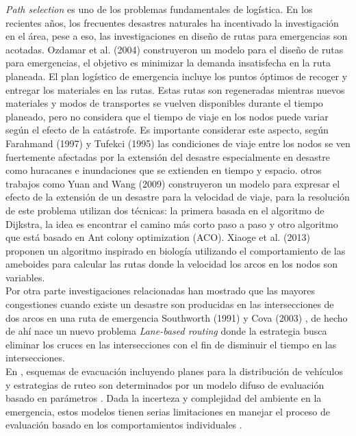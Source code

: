 \documentclass[letter, 10pt]{article}
\begin{document}
\textit{Path selection} es uno de los problemas fundamentales de logística. En los recientes años, los frecuentes desastres naturales ha incentivado la investigación en el área, pese a eso, las investigaciones en diseño de rutas para emergencias son acotadas. 
Ozdamar et al. (2004) \cite{ozdamar2004emergency} construyeron un modelo para el diseño de rutas para emergencias, el objetivo es minimizar la demanda insatisfecha en la ruta planeada. El plan logístico de emergencia incluye los puntos óptimos de recoger y entregar los materiales en las rutas. Estas rutas son regeneradas mientras nuevos materiales y modos de transportes se vuelven disponibles durante el tiempo planeado, pero no considera que el tiempo de viaje en los nodos puede variar según el efecto de la catástrofe.
Es  importante considerar este aspecto, según Farahmand (1997) \cite{farahmand1997application} y Tufekci  (1995) \cite{tufekci1995integrated} las condiciones de viaje entre los nodos se ven fuertemente afectadas por la extensión del desastre especialmente en desastre como huracanes e inundaciones que se extienden en tiempo y espacio. otros trabajos como 
Yuan and Wang (2009) \cite{Yuan20091081} construyeron un modelo para expresar el efecto de la extensión de un desastre para la velocidad de viaje, para la resolución de este problema utilizan dos técnicas: la primera basada en el algoritmo de Dijkstra, la idea es encontrar el camino más corto paso a paso y otro algoritmo que está basado en Ant colony optimization (ACO). 
Xiaoge et al. (2013) \cite{zhang2013route} proponen un algoritmo inspirado en biología utilizando el comportamiento de las ameboides para calcular las rutas donde la velocidad los arcos en los nodos son variables.\\
Por otra parte investigaciones relacionadas han mostrado que las mayores congestiones cuando existe un desastre son producidas en las intersecciones de dos arcos en una ruta de emergencia Southworth (1991) \cite{southworth1991regional} y Cova (2003) \cite{cova2003network}, de hecho de ahí nace un nuevo problema \textit{Lane-based routing} donde la estrategia busca eliminar los cruces en las intersecciones con el fin de disminuir el tiempo en las intersecciones. \cite{cova2003network}\\
En \cite{tan2011if}, esquemas de evacuación incluyendo planes para la distribución de vehículos y estrategias de ruteo son determinados por un modelo difuso de evaluación basado en parámetros \cite{tan2011if}. Dada la incerteza y complejidad del ambiente en la emergencia, estos modelos tienen serias limitaciones en manejar el proceso de evaluación basado en los comportamientos individuales \cite{liu2016evacuation}.\\
\end{document}
